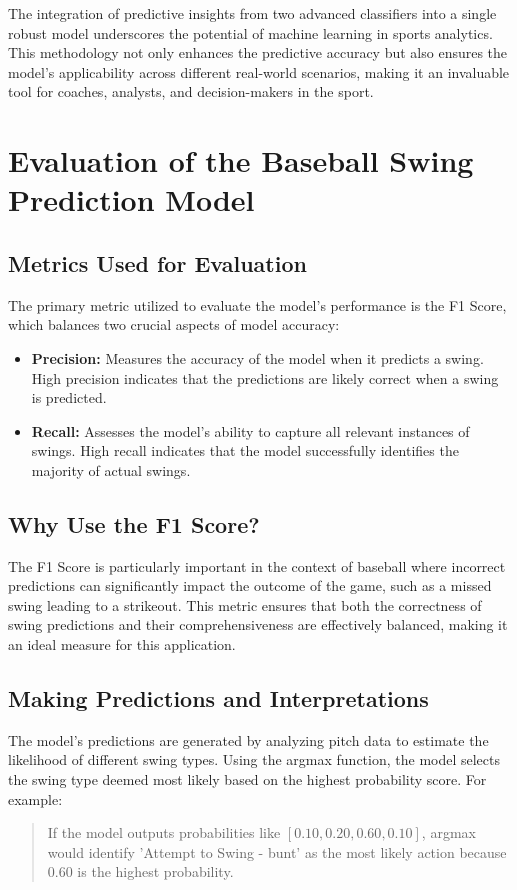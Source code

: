\documentclass[12pt]{article}
\begin{document}
\textbf{}
The integration of predictive insights from two advanced classifiers into a single robust model underscores the potential of machine learning in sports analytics. This methodology not only enhances the predictive accuracy but also ensures the model's applicability across different real-world scenarios, making it an invaluable tool for coaches, analysts, and decision-makers in the sport.

\maketitle

\section{Evaluation of the Baseball Swing Prediction Model}

\subsection*{Metrics Used for Evaluation}
The primary metric utilized to evaluate the model's performance is the F1 Score, which balances two crucial aspects of model accuracy:
\begin{itemize}
    \item \textbf{Precision:} Measures the accuracy of the model when it predicts a swing. High precision indicates that the predictions are likely correct when a swing is predicted.
    \item \textbf{Recall:} Assesses the model's ability to capture all relevant instances of swings. High recall indicates that the model successfully identifies the majority of actual swings.
\end{itemize}

\subsection*{Why Use the F1 Score?}
The F1 Score is particularly important in the context of baseball where incorrect predictions can significantly impact the outcome of the game, such as a missed swing leading to a strikeout. This metric ensures that both the correctness of swing predictions and their comprehensiveness are effectively balanced, making it an ideal measure for this application.

\subsection*{Making Predictions and Interpretations}
The model’s predictions are generated by analyzing pitch data to estimate the likelihood of different swing types. Using the argmax function, the model selects the swing type deemed most likely based on the highest probability score. For example:
\begin{quote}
    If the model outputs probabilities like \([0.10, 0.20, 0.60, 0.10]\), argmax would identify 'Attempt to Swing - bunt' as the most likely action because \(0.60\) is the highest probability.
\end{quote}
\end{document}
